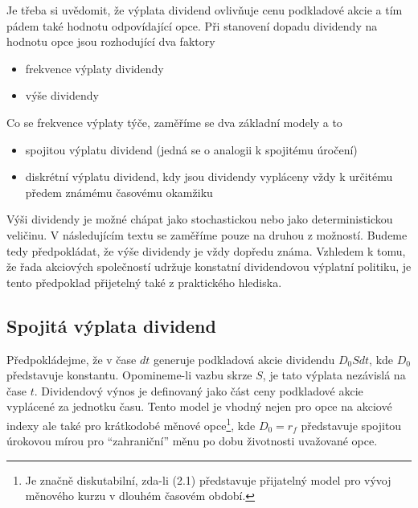 \documentclass[a4paper]{book}
\begin{document}
Je třeba si uvědomit, že výplata dividend ovlivňuje cenu podkladové akcie a tím pádem také hodnotu odpovídající opce. Při stanovení dopadu dividendy na hodnotu opce jsou rozhodující dva faktory
\begin{itemize}
\item frekvence výplaty dividendy
\item výše dividendy
\end{itemize}
Co se frekvence výplaty týče, zaměříme se dva základní modely a to
\begin{itemize}
\item spojitou výplatu dividend (jedná se o analogii k spojitému úročení)
\item diskrétní výplatu dividend, kdy jsou dividendy vypláceny vždy k určitému předem známému časovému okamžiku
\end{itemize}
Výši dividendy je možné chápat jako stochastickou nebo jako deterministickou veličinu. V následujícím textu se zaměříme pouze na druhou z možností. Budeme tedy předpokládat, že výše dividendy je vždy dopředu známa. Vzhledem k tomu, že řada akciových společností udržuje konstatní dividendovou výplatní politiku, je tento předpoklad přijetelný také z praktického hlediska.

\subsection{Spojitá výplata dividend}

Předpokládejme, že v čase $dt$ generuje podkladová akcie dividendu $D_0Sdt$, kde $D_0$ představuje konstantu. Opomineme-li vazbu skrze $S$, je tato výplata nezávislá na čase $t$. Dividendový výnos je definovaný jako část ceny podkladové akcie vyplácené za jednotku času. Tento model je vhodný nejen pro opce na akciové indexy ale také pro krátkodobé měnové opce\footnote{Je značně diskutabilní, zda-li (2.1) představuje přijatelný model pro vývoj měnového kurzu v dlouhém časovém období.}, kde $D_0 = r_f$ představuje spojitou úrokovou mírou pro ``zahraniční'' měnu po dobu životnosti uvažované opce.
\end{document}
